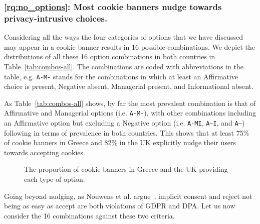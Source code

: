 \subsubsection{\ref{rq:no_options}: Most cookie banners nudge towards privacy-intrusive choices.}
Considering all the ways the four categories of options that we have discussed may appear in a cookie banner results in 16 possible combinations. 
We depict the distributions of all these 16 option combinations in both countries in Table~\ref{tab:combos-all}. The combinations are coded with abbreviations in the table, e.g. \texttt{A-M-} stands for the combinations in which at least an Affirmative choice is present, Negative absent, Managerial present, and Informational absent. 

As Table~\ref{tab:combos-all} shows, by far the most prevalent combination is that of Affirmative and Managerial options (i.e. \texttt{A-M-}), with other combinations including an Affirmative option but excluding a Negative option (i.e. \texttt{A-MI}, \texttt{A--I}, and \texttt{A---}) following in terms of prevalence in both countries. 
This shows that at least 75\% of cookie banners in Greece and 82\% in the UK explicitly nudge their users towards accepting cookies. 

\begin{figure}[t]
    \centering
    \caption{The proportion of cookie banners in Greece and the UK providing each type of option.}
    \label{fig:priv_categories_breakdown}
\end{figure}

Going beyond nudging, as Nouwens et al. argue~\cite{nouwens2020dark}, implicit consent and reject not being as easy as accept are both violations of GDPR and DPA. Let us now consider the 16 combinations against these two criteria. 

